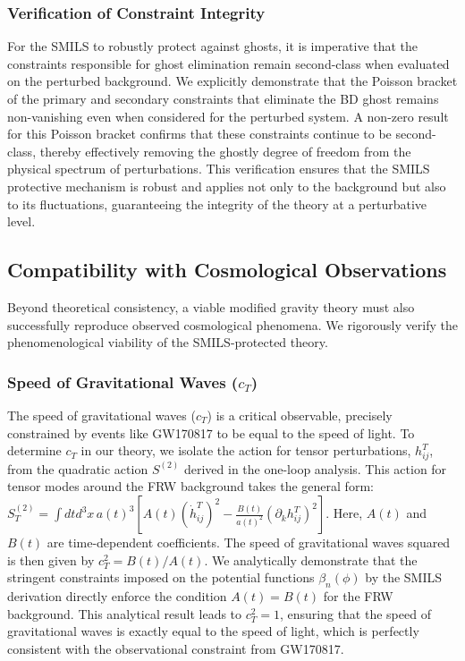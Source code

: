 \documentclass[twocolumn]{aastex631}
\begin{document}
\subsubsection{Verification of Constraint Integrity}
For the SMILS to robustly protect against ghosts, it is imperative that the constraints responsible for ghost elimination remain second-class when evaluated on the perturbed background. We explicitly demonstrate that the Poisson bracket of the primary and secondary constraints that eliminate the BD ghost remains non-vanishing even when considered for the perturbed system. A non-zero result for this Poisson bracket confirms that these constraints continue to be second-class, thereby effectively removing the ghostly degree of freedom from the physical spectrum of perturbations. This verification ensures that the SMILS protective mechanism is robust and applies not only to the background but also to its fluctuations, guaranteeing the integrity of the theory at a perturbative level.

\subsection{Compatibility with Cosmological Observations}
Beyond theoretical consistency, a viable modified gravity theory must also successfully reproduce observed cosmological phenomena. We rigorously verify the phenomenological viability of the SMILS-protected theory.

\subsubsection{Speed of Gravitational Waves ($c_T$)}
The speed of gravitational waves ($c_T$) is a critical observable, precisely constrained by events like GW170817 to be equal to the speed of light. To determine $c_T$ in our theory, we isolate the action for tensor perturbations, $h_{ij}^T$, from the quadratic action $S^{(2)}$ derived in the one-loop analysis. This action for tensor modes around the FRW background takes the general form:
$S^{(2)}_T = \int dt d^3x \, a(t)^3 \left[ A(t) (\dot{h}_{ij}^T)^2 - \frac{B(t)}{a(t)^2} (\partial_k h_{ij}^T)^2 \right]$.
Here, $A(t)$ and $B(t)$ are time-dependent coefficients. The speed of gravitational waves squared is then given by $c_T^2 = B(t)/A(t)$. We analytically demonstrate that the stringent constraints imposed on the potential functions $\beta_n(\phi)$ by the SMILS derivation directly enforce the condition $A(t) = B(t)$ for the FRW background. This analytical result leads to $c_T^2 = 1$, ensuring that the speed of gravitational waves is exactly equal to the speed of light, which is perfectly consistent with the observational constraint from GW170817.
\end{document}
